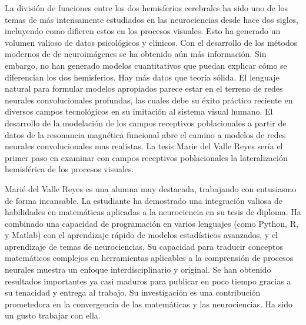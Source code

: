 \begin{opinion}
    La división de funciones entre los dos hemisferios cerebrales ha sido uno de los temas de más intensamente estudiados en las neurociencias desde hace dos siglos, incluyendo como difieren estos en los procesos visuales. Esto ha generado un volumen valioso de datos psicológicos y clínicos. Con el desarrollo de los métodos modernos de de neuroimágenes se ha obtenido aún más información. Sin embargo, no han generado modelos cuantitativos que puedan explicar cómo se diferencian los dos hemisferios. Hay más datos que teoría sólida. El lenguaje natural para formular modelos apropiados parece estar en el terreno de redes neurales convolucionales profundas, las cuales debe su éxito práctico reciente en diversos campos tecnológicos en su imitación al sistema visual humano. El desarrollo de la modelación de los campos receptivos poblacionales a partir de datos de la resonancia magnética funcional abre el camino a modelos de redes neurales convolucionales mas realistas.  La tesis Marie del Valle Reyes sería el primer paso en examinar con campos receptivos poblacionales la lateralización hemisférica de los procesos visuales.
    
    Mari\'e del Valle Reyes es una alumna muy destacada, trabajando con entusiasmo de forma incansable. La estudiante ha demostrado una integración valiosa de habilidades en matemáticas aplicadas a la neurociencia en su tesis de diploma. Ha combinado una capacidad de programación en varios lenguajes (como Python, R, y Matlab) con el aprendizaje rápido de modelos estadísticos avanzados, y el aprendizaje de temas de neurociencias. Su capacidad para traducir conceptos matemáticos complejos en herramientas aplicables a la comprensión de procesos neurales muestra un enfoque interdisciplinario y original. Se han obtenido resultados importantes ya casi maduros para publicar en poco tiempo gracias a su tenacidad y entrega al trabajo. Su investigación es una contribución prometedora en la convergencia de las matemáticas y las neurociencias. Ha sido un gusto trabajar con ella.
\end{opinion}